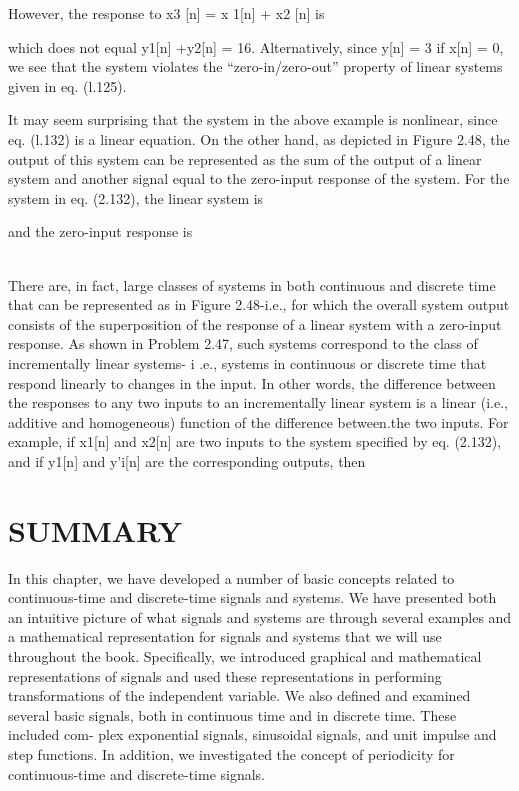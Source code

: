 \documentclass{report}
\begin{document}
However, the response to x3 [n] = x 1[n] + x2 [n] is



which does not equal y1[n] +y2[n] = 16. Alternatively, since y[n] = 3 if x[n] = 0, we see that the system violates the {``}zero-in/zero-out{''} property
of linear systems given in eq. (l.125).

It may seem surprising that the system in the above example is nonlinear, since eq. (l.132) is a linear equation. On the other hand, as depicted
in Figure 2.48, the output of this system can be represented as the sum of the output of a linear system and another signal equal to the zero-input
response of the system. For the system in eq. (2.132), the linear system is



and the zero-input response is



\\
There are, in fact, large classes of systems in both continuous and discrete time that can be represented as in Figure 2.48-i.e., for which the overall
system output consists of the superposition of the response of a linear system with a zero-input response. As shown in Problem 2.47, such systems
correspond to the class of incrementally linear systems- i .e., systems in continuous or discrete time that respond linearly to changes in the input.
In other words, the difference between the responses to any two inputs to an incrementally linear system is a linear (i.e., additive and homogeneous)
function of the difference between.the two inputs. For example, if x1[n] and x2[n] are two inputs to the system specified by eq. (2.132), and if
y1[n] and y{'}i[n] are the corresponding outputs, then

\section*{SUMMARY}

In this chapter, we have developed a number of basic concepts related to continuous-time and discrete-time signals and systems. We have presented
both an intuitive picture of what signals and systems are through several examples and a mathematical representation for signals and systems that
we will use throughout the book. Specifically, we introduced graphical and mathematical representations of signals and used these representations
in performing transformations of the independent variable. We also defined and examined several basic signals, both in continuous time and in discrete
time. These included com- plex exponential signals, sinusoidal signals, and unit impulse and step functions. In addition, we investigated the concept
of periodicity for continuous-time and discrete-time signals.
\end{document}
